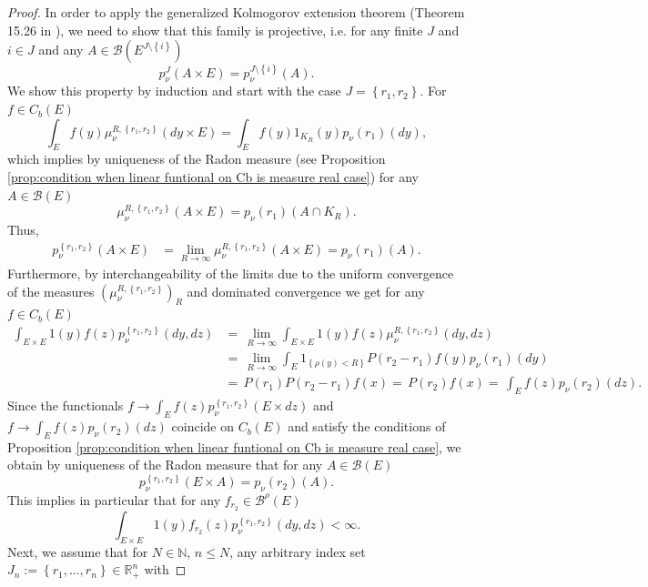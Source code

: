 \documentclass[a4paper,12pt]{article}
\theoremstyle{definition}
\theoremstyle{remark}
\numberwithin{equation}{section}
\numberwithin{theorem}{section}
\begin{document}
\begin{proof}
In order to apply the generalized Kolmogorov extension theorem (Theorem 15.26 in \cite{AlB}), we need to show
that this family is projective, i.e. for any finite $J$ and $i\in J$
and any $A\in \mathcal{B}\left(E^{J\setminus\left\{ i\right\} } \right)$
\[
p_{\nu}^{J}(A\times E)=p_{\nu}^{J\setminus\left\{ i\right\} }(A).
\]
We show this property by induction and start with the case $J=\left\{ r_{1},r_{2}\right\} $.
For $f\in C_{b}(E)$ 
\[
\int_{E}f(y)\mu_{\nu}^{R,\left\{ r_{1},r_{2}\right\} }(dy \times E)=\int_{E}f(y)1_{K_{R}}(y)p_{\nu}(r_{1})(dy),
\]
which implies by uniqueness of the Radon measure (see Proposition
\ref{prop:condition when linear funtional on Cb is measure real case})
for any $A\in\mathcal{B}\left(E\right)$
\[
\mu_{\nu}^{R,\left\{ r_{1},r_{2}\right\} }(A \times E)=p_{\nu}(r_{1})(A\cap K_{R}).
\]
Thus, 
\begin{align*}
p_{\nu}^{\left\{ r_{1},r_{2}\right\} }(A\times E) & =\underset{R\rightarrow\infty}{\lim}\mu_{\nu}^{R,\left\{ r_{1},r_{2}\right\} }(A\times E)
 =p_{\nu}(r_{1})(A).
\end{align*}
Furthermore,  by interchangeability of the limits due to the uniform convergence of the measures $(\mu_{\nu}^{R,\left\{ r_{1},r_{2}\right\} })_R$ and dominated
convergence we get
for any $f\in C_{b}(E)$ 
\begin{align*}
  \int_{E \times E}1(y)f(z)p_{\nu}^{\left\{ r_{1},r_{2}\right\} }(dy,dz)
 &= \,\underset{R\rightarrow\infty}{\lim}\int_{E\times E}1(y)f(z)\mu_{\nu}^{R,\left\{ r_{1},r_{2}\right\} }(dy,dz)\\
& = \,\underset{R\rightarrow\infty}{\lim}\int_{E}1_{\left\{ \rho(y)<R\right\} }P(r_{2}-r_{1})f(y)p_{\nu}(r_{1})(dy) \\
&= \,P(r_{1})P(r_{2}-r_{1})f(x)= \,P(r_{2})f(x)= \,\int_{E}f(z)p_{\nu}(r_{2})(dz).
\end{align*}
Since the functionals
$f \rightarrow\int_{E}f(z)p_{\nu}^{\left\{ r_{1},r_{2}\right\} }(E \times dz)$
and 
$
f  \rightarrow\int_{E}f(z)p_{\nu}(r_{2})(dz)$
coincide on $C_{b}(E)$ and satisfy the conditions of Proposition
\ref{prop:condition when linear funtional on Cb is measure real case}, we obtain 
by uniqueness of the Radon measure 
that
for any $A\in\mathcal{B}\left(E\right)$ 
\[
p_{\nu}^{\left\{ r_{1},r_{2}\right\} }(E\times A)=p_{\nu}(r_{2})(A).
\]
This implies in particular that for any $f_{r_{2}}\in\mathscr{B}^{\rho}(E)$
\[
\int_{E\times E}1(y)f_{r_{2}}(z)p_{\nu}^{\left\{ r_{1},r_{2}\right\} }(dy,dz)<\infty.
\]
Next, we assume that for $N\in\mathbb{N}$, 
$n\leq N$, any arbitrary  index set $J_{n}:=\left\{ r_{1},...,r_{n}\right\} \in\mathbb{R}_{+}^{n}$ with

\end{proof}
\end{document}
